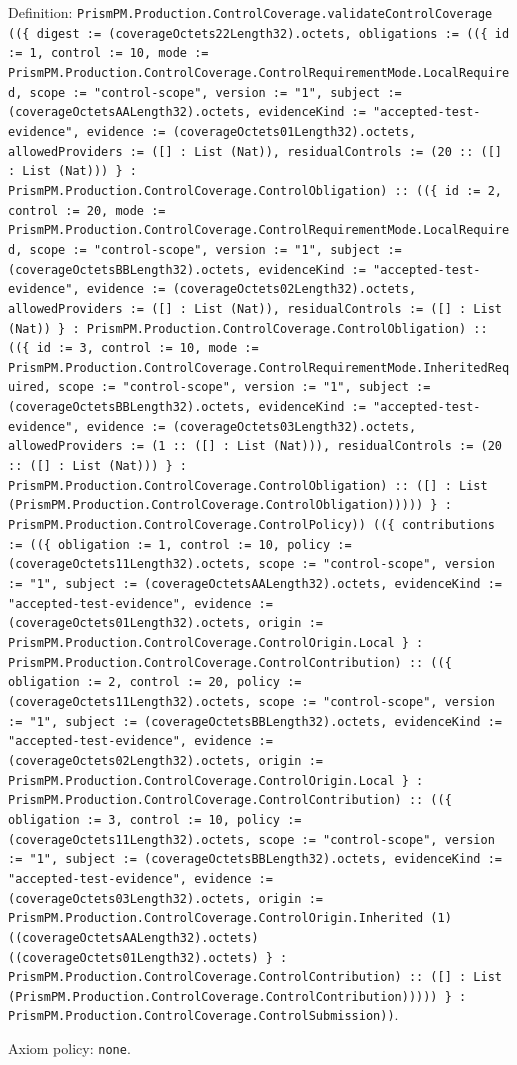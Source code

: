 \documentclass[11pt]{article}
\begin{document}
\noindent Definition: \texttt{PrismPM.Production.ControlCoverage.validateControlCoverage ((\{ digest := (coverageOctets22Length32).octets, obligations := ((\{ id := 1, control := 10, mode := PrismPM.Production.ControlCoverage.ControlRequirementMode.LocalRequired, scope := "control-scope", version := "1", subject := (coverageOctetsAALength32).octets, evidenceKind := "accepted-test-evidence", evidence := (coverageOctets01Length32).octets, allowedProviders := ([] : List (Nat)), residualControls := (20 :: ([] : List (Nat))) \} : PrismPM.Production.ControlCoverage.ControlObligation) :: ((\{ id := 2, control := 20, mode := PrismPM.Production.ControlCoverage.ControlRequirementMode.LocalRequired, scope := "control-scope", version := "1", subject := (coverageOctetsBBLength32).octets, evidenceKind := "accepted-test-evidence", evidence := (coverageOctets02Length32).octets, allowedProviders := ([] : List (Nat)), residualControls := ([] : List (Nat)) \} : PrismPM.Production.ControlCoverage.ControlObligation) :: ((\{ id := 3, control := 10, mode := PrismPM.Production.ControlCoverage.ControlRequirementMode.InheritedRequired, scope := "control-scope", version := "1", subject := (coverageOctetsBBLength32).octets, evidenceKind := "accepted-test-evidence", evidence := (coverageOctets03Length32).octets, allowedProviders := (1 :: ([] : List (Nat))), residualControls := (20 :: ([] : List (Nat))) \} : PrismPM.Production.ControlCoverage.ControlObligation) :: ([] : List (PrismPM.Production.ControlCoverage.ControlObligation))))) \} : PrismPM.Production.ControlCoverage.ControlPolicy)) ((\{ contributions := ((\{ obligation := 1, control := 10, policy := (coverageOctets11Length32).octets, scope := "control-scope", version := "1", subject := (coverageOctetsAALength32).octets, evidenceKind := "accepted-test-evidence", evidence := (coverageOctets01Length32).octets, origin := PrismPM.Production.ControlCoverage.ControlOrigin.Local \} : PrismPM.Production.ControlCoverage.ControlContribution) :: ((\{ obligation := 2, control := 20, policy := (coverageOctets11Length32).octets, scope := "control-scope", version := "1", subject := (coverageOctetsBBLength32).octets, evidenceKind := "accepted-test-evidence", evidence := (coverageOctets02Length32).octets, origin := PrismPM.Production.ControlCoverage.ControlOrigin.Local \} : PrismPM.Production.ControlCoverage.ControlContribution) :: ((\{ obligation := 3, control := 10, policy := (coverageOctets11Length32).octets, scope := "control-scope", version := "1", subject := (coverageOctetsBBLength32).octets, evidenceKind := "accepted-test-evidence", evidence := (coverageOctets03Length32).octets, origin := PrismPM.Production.ControlCoverage.ControlOrigin.Inherited (1) ((coverageOctetsAALength32).octets) ((coverageOctets01Length32).octets) \} : PrismPM.Production.ControlCoverage.ControlContribution) :: ([] : List (PrismPM.Production.ControlCoverage.ControlContribution))))) \} : PrismPM.Production.ControlCoverage.ControlSubmission))}.\par
\noindent Axiom policy: \texttt{none}.\par
\end{document}
